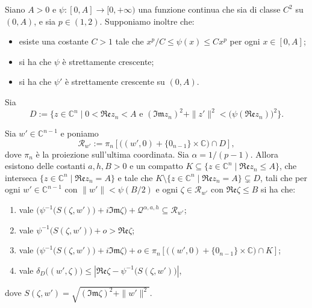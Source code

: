 \begin{lm}
    Siano $A>0$ e $\psi:[0,A]\longrightarrow[0,+\infty)$ una funzione continua che sia di classe $C^2$ su $(0,A)$, e sia $p\in(1,2)$. Supponiamo inoltre che:
    \begin{itemize}
        \item esiste una costante $C>1$ tale che $x^p/C\le\psi(x)\le Cx^p$ per ogni $x\in[0,A]$;
        \item si ha che $\psi$ è strettamente crescente;
        \item si ha che $\psi'$ è strettamente crescente su $(0,A)$.
    \end{itemize}

    Sia
    $$D:=\{z\in\mathbb{C}^n\mid 0<\mathfrak{Re}z_n<A\text{ e }(\mathfrak{Im}z_n)^2+\|z'\|^2<\big(\psi(\mathfrak{Re}z_n)\big)^2\}.$$

    Sia $w'\in\mathbb{C}^{n-1}$ e poniamo
    $$\mathcal{R}_{w'}:=\pi_n\left[\big((w',0)+\{0_{n-1}\}\times\mathbb{C}\big)\cap D\right],$$
    dove $\pi_n$ è la proiezione sull'ultima coordinata. Sia $\alpha=1/(p-1)$. Allora esistono delle costanti $a,h,B>0$ e un compatto $K\subseteq\{z\in\mathbb{C}^n\mid\mathfrak{Re}z_n\le A\}$, che interseca $\{z\in\mathbb{C}^n\mid\mathfrak{Re}z_n=A\}$ e tale che $K\setminus\{z\in\mathbb{C}^n\mid\mathfrak{Re}z_n=A\}\subsetneq D$, tali che per ogni $w'\in\mathbb{C}^{n-1}$ con $\|w'\|<\psi(B/2)$ e ogni $\zeta\in\mathcal{R}_{w'}$ con $\mathfrak{Re}\zeta\le B$ si ha che:
    \begin{enumerate}[label={(\arabic*)}]
        \item vale $\Big(\psi^{-1}\big(S(\zeta,w')\big)+i\mathfrak{Im}\zeta\Big)+\mathcal{Q}^{\alpha,a,h}\subseteq\mathcal{R}_{w'}$;
        \item vale $\psi^{-1}\big(S(\zeta,w')\big)+o>\mathfrak{Re}\zeta$;
        \item vale $\Big(\psi^{-1}\big(S(\zeta,w')\big)+i\mathfrak{Im}\zeta\Big)+o\in\pi_n\left[\big((w',0)+\{0_{n-1}\}\times\mathbb{C}\big)\cap K\right]$;
        \item vale $\delta_D\big((w',\zeta)\big) \le \left|\mathfrak{Re}\zeta-\psi^{-1}\big(S(\zeta,w')\big)\right|$,
    \end{enumerate}
    dove $S(\zeta,w')=\sqrt{(\mathfrak{Im}\zeta)^2+\|w'\|^2}$.
\end{lm}

